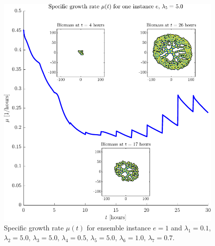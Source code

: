 \begin{figure}[!htb] %
    \centering
    \includegraphics[width= \textwidth]{
        chapter3/figures/Inset_L1_0o10_L2_5o00_L3_5o00_L4_0o50_L5_5o00_L6_1o00_L7_0o70.pdf}
    \caption{Specific growth rate $\mu(t)$ for ensemble instance $e = 1$ and 
             $\lambda_1 = 0.1$,  
             $\lambda_2 = 5.0$, 
             $\lambda_3 = 5.0$, 
             $\lambda_4 = 0.5$, 
             $\lambda_5 = 5.0$, 
             $\lambda_6 = 1.0$, 
             $\lambda_7 = 0.7$.}
    \label{fig: sdsd}
\end{figure}

